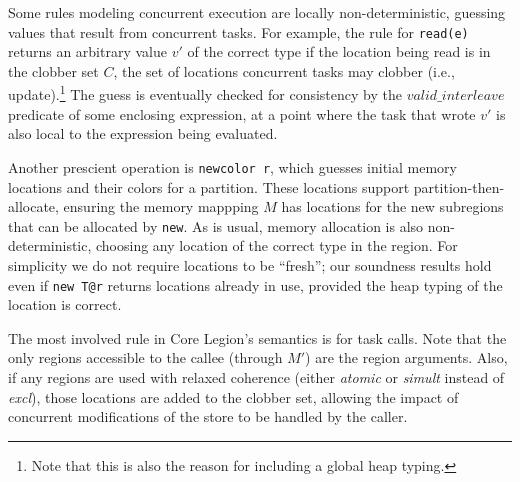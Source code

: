 Some rules modeling concurrent execution are locally
non-deterministic, guessing values that result from
concurrent tasks.  For example, the rule for {\tt read(e)} returns an
arbitrary value $v'$ of the correct type if the location being read is
in the clobber set $C$, the set of locations concurrent tasks may
clobber (i.e., update).\footnote{Note that this is also the reason for
including a global heap typing.}  The guess is eventually checked for
consistency by the $valid\_interleave$ predicate of some enclosing
expression, at a point where the task that wrote $v'$ is also local to
the expression being evaluated.

Another prescient operation is {\tt newcolor r}, which guesses initial
memory locations and their colors for a partition.  These locations
support partition-then-allocate, ensuring the memory mappping $M$ has
locations for the new subregions that can be allocated by {\tt new}.
As is usual, memory allocation is also non-deterministic, choosing any
location of the correct type in the region.  For simplicity we do not
require locations to be ``fresh''; our soundness results hold even if
{\tt new T@r} returns locations already in use, provided the heap
typing of the location is correct.

The most involved rule in Core Legion's semantics is for task calls.
Note that the only regions accessible to the callee (through $M'$) are the region arguments.
Also, if any regions are used with relaxed coherence (either {\em atomic} or {\em simult} instead of
{\em excl}), those locations are added to the clobber set, allowing the
impact of concurrent modifications of the store to be handled by the caller.  

